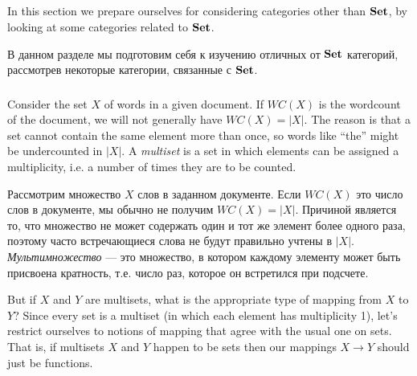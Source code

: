 \documentclass[CT4S-EN-RU]{subfiles}
\begin{document}

\subsection{}

\begin{blockENG}
In this section we prepare ourselves for considering categories other than ${\bf Set}$, by looking at some categories related to ${\bf Set}$. 
\end{blockENG}

\begin{blockRUS}
В данном разделе мы подготовим себя к изучению отличных от ${\bf Set}$ категорий, рассмотрев некоторые категории, связанные с ${\bf Set}$. 
\end{blockRUS}


\subsubsection{}

\begin{blockENG}
Consider the set $X$ of words in a given document. If $WC(X)$ is the wordcount of the document, we will not generally have $WC(X)=|X|$. The reason is that a set cannot contain the same element more than once, so words like “the” might be undercounted in $|X|$. A {\em multiset} is a set in which elements can be assigned a multiplicity, i.e. a number of times they are to be counted. 
\end{blockENG}

\begin{blockRUS}
Рассмотрим множество $X$ слов в заданном документе. Если $WC(X)$ это число слов в документе, мы обычно не получим $WC(X)=|X|$. Причиной является то, что множество не может содержать один и тот же элемент более одного раза, поэтому часто встречающиеся слова не будут правильно учтены в $|X|$. {\em Мультимножество} — это множество, в котором каждому элементу может быть присвоена кратность, т.е. число раз, которое он встретился при подсчете. 
\end{blockRUS}

\begin{blockENG}
But if $X$ and $Y$ are multisets, what is the appropriate type of mapping from $X$ to $Y$? Since every set is a multiset (in which each element has multiplicity 1), let's restrict ourselves to notions of mapping that agree with the usual one on sets. That is, if multisets $X$ and $Y$ happen to be sets then our mappings $X\to Y$ should just be functions.
\end{blockENG}
\end{document}
